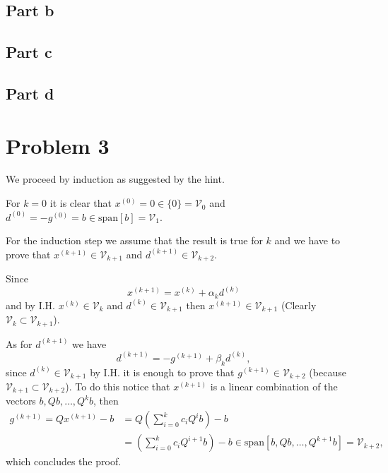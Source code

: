 \documentclass{article}
\begin{document}
\subsection*{Part b}
\subsection*{Part c}
\subsection*{Part d}
\section*{Problem 3}
We proceed by induction as suggested by the hint.

For $k=0$ it is clear that $x^{(0)}=0\in\{0\}=\mathcal{V}_0$ and
$d^{(0)}=-g^{(0)}=b\in \text{span}[b]=\mathcal{V}_1$.

For the induction step we assume that the result is true for $k$ and we have to
prove that $x^{(k+1)}\in \mathcal{V}_{k+1}$ and $d^{(k+1)}\in
\mathcal{V}_{k+2}$.

Since
\[
x^{(k+1)}=x^{(k)}+\alpha_kd^{(k)}
\]
and by I.H. $x^{(k)}\in \mathcal{V}_k$ and $d^{(k)}\in\mathcal{V}_{k+1}$ then
$x^{(k+1)}\in
\mathcal{V}_{k+1}$ (Clearly $\mathcal{V}_k\subset\mathcal{V}_{k+1}$).

As for $d^{(k+1)}$ we have
\[
d^{(k+1)}=-g^{(k+1)}+\beta_k d^{(k)},
\]
since $d^{(k)}\in\mathcal{V}_{k+1}$ by I.H. it is enough to prove that
$g^{(k+1)}\in\mathcal{V}_{k+2}$ (because
$\mathcal{V}_{k+1}\subset\mathcal{V}_{k+2}$). To do this notice that
$x^{(k+1)}$ is a linear combination of the vectors $b,Qb,\dots,Q^{k}b$, then
\begin{align*}
g^{(k+1)}=Qx^{(k+1)}-b&=Q\left(\sum_{i=0}^kc_iQ^ib\right) -b\\
&=\left(\sum_{i=0}^kc_iQ^{i+1}b\right)-b \in
\text{span}[b,Qb,\dots,Q^{k+1}b]=\mathcal{V}_{k+2},
\end{align*}
which concludes the proof.
\end{document}
